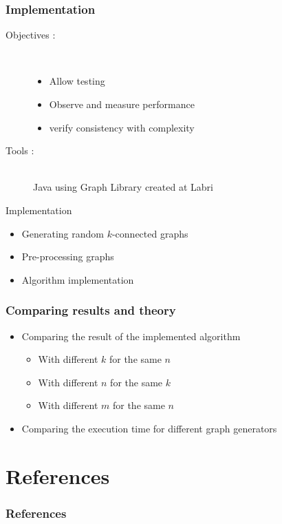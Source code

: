 \documentclass[xcolor=dvipsnames]{beamer}
\begin{document}
\begin{frame}
\frametitle{Implementation}
\begin{description}
	\item [Objectives :] \hfill \\
	\begin{itemize}
		 \item Allow testing 
		\item Observe and measure performance
        \item verify consistency with complexity
     \end{itemize}

 \item[Tools :] \hfill \\
		Java using Graph Library created at Labri
  \end{description}
\end{frame}

\begin{frame}{Implementation}
  \begin{itemize}
  \item Generating random $k$-connected graphs
  \item Pre-processing graphs
  \item Algorithm implementation
  \end{itemize}
\end{frame}

\begin{frame}
  \frametitle{Comparing results and theory}
  \begin{itemize}
  \item Comparing the result of the implemented algorithm
    \begin{itemize}
    \item With different $k$ for the same $n$
    \item With different $n$ for the same $k$
    \item With different $m$ for the same $n$
    \end{itemize}
  \item Comparing the execution time for different graph generators
  \end{itemize}
\end{frame}

\section*{References}
\begin{frame}[allowframebreaks]
  \frametitle{References}
  

  
\end{frame}
\end{document}
